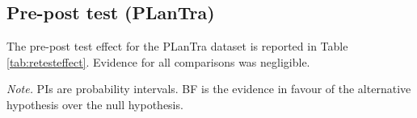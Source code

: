 \documentclass[
  english,
  man,floatsintext]{apa7}
\begin{document}
\begin{appendix}
\section{}
\hypertarget{pre-post-test-plantra}{%
\subsection{Pre-post test (PLanTra)}\label{pre-post-test-plantra}}

The pre-post test effect for the PLanTra dataset is reported in Table
\ref{tab:retesteffect}. Evidence for all comparisons was negligible.

\begin{center}
\begin{ThreePartTable}

\begin{TableNotes}[para]
\normalsize{\textit{Note.} PIs are probability intervals. BF is the evidence in favour of the alternative hypothesis over the null hypothesis.}
\end{TableNotes}

\footnotesize{

}
\end{ThreePartTable}
\end{center}
\end{appendix}
\end{document}

